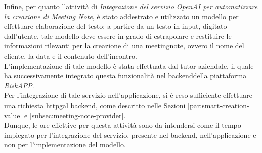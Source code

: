 Infine, per quanto l'attività di \emph{Integrazione del servizio OpenAI per automatizzare la creazione di Meeting Note}, è stato addestrato e utilizzato un modello per effettuare elaborazione del testo: a partire da un testo in input, digitato dall'utente, tale modello deve essere in grado di estrapolare e restituire le informazioni rilevanti per la creazione di una \gls{meetingnote}\glsoccur, ovvero il nome del cliente, la data e il contenuto dell'incontro.\\
L'implementazione di tale modello è stata effettuata dal tutor aziendale, il quale ha successivamente integrato questa funzionalità nel \gls{backend}\glsoccur della piattaforma \emph{RiskAPP}.\\
Per l'integrazione di tale servizio nell'applicazione, si è reso sufficiente effettuare una richiesta \gls{httpg}\glsoccur al \gls{backend}\glsoccur, come descritto nelle Sezioni \ref{par:smart-creation-value} e \ref{subsec:meeting-note-provider}. \\
Dunque, le ore effettive per questa attività sono da intendersi come il tempo impiegato per l'integrazione del servizio, presente nel \gls{backend}\glsoccur, nell'applicazione e non per l'implementazione del modello.\\

